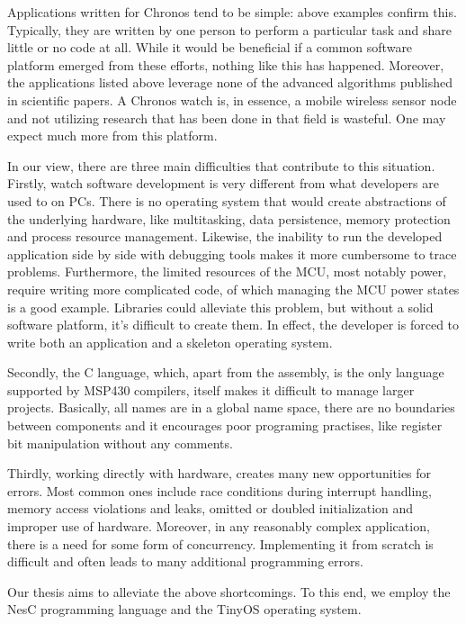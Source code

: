 Applications written for Chronos tend to be simple: above examples
confirm this. Typically, they are written by one person to perform a
particular task and share little or no code at all.  While it would be
beneficial if a common software platform emerged from these efforts,
nothing like this has happened. Moreover, the applications listed
above leverage none of the advanced algorithms published in
scientific papers. A Chronos watch is, in essence, a mobile wireless
sensor node and not utilizing research that has been done in
that field is wasteful. One may expect much more from this platform.

In our view, there are three main difficulties that contribute to this
situation.  Firstly, watch software development is very different from
what developers are used to on PCs. There is no operating system
that would create abstractions of the underlying hardware, like
multitasking, data persistence, memory protection and process resource
management.  Likewise, the inability to run the developed application side by
side with debugging tools makes it more cumbersome to trace problems.
Furthermore, the limited resources of the MCU, most notably power, require writing more
complicated code, of which managing the MCU power states is a good example.
Libraries could alleviate this problem, but without a solid software
platform, it's difficult to create them. In effect, the developer is forced
to write both an application and a skeleton operating system.

Secondly, the C language, which, apart from the assembly, is the only
language supported by MSP430 compilers,  itself makes it difficult to
manage larger projects. Basically, all names are in a global name
space, there are no boundaries between components and it encourages
poor programing practises, like register bit manipulation without any
comments.

Thirdly, working directly with hardware, creates many new
opportunities for errors. Most common ones include race conditions during
interrupt handling, memory access violations and leaks, omitted or
doubled initialization and improper use of hardware.  Moreover, in any
reasonably complex application, there is a need for some form of
concurrency.  Implementing it from scratch is difficult and often
leads to many additional programming errors.

Our thesis aims to alleviate the above shortcomings. To this end, we
employ the NesC programming language and the TinyOS operating system.


